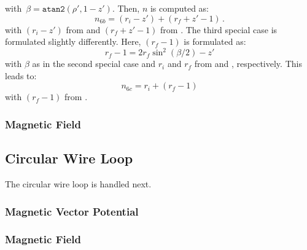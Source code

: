 with~$\beta = \texttt{atan2}(\rho', 1-z')$.
Then, $n$ is computed as:
\begin{equation}
  n_{6b} = (r_i - z') + (r_f + z'-1) \, .
\end{equation}
with $(r_i - z')$ from  and $(r_f + z' - 1)$ from .
The third special case is formulated slightly differently.
Here, $(r_f-1)$ is formulated as:
\begin{equation}
  r_f - 1 = 2 r_f \sin^2(\beta/2) - z' \label{eqn:rf_1}
\end{equation}
with $\beta$ as in the second special case
and $r_i$ and $r_f$ from  and , respectively.
This leads to:
\begin{equation}
  n_{6c} = r_i + (r_f - 1)
\end{equation}
with $(r_f - 1)$ from .

\subsubsection{Magnetic Field}


\subsection{Circular Wire Loop}
The circular wire loop is handled next.

\subsubsection{Magnetic Vector Potential}


\subsubsection{Magnetic Field}


